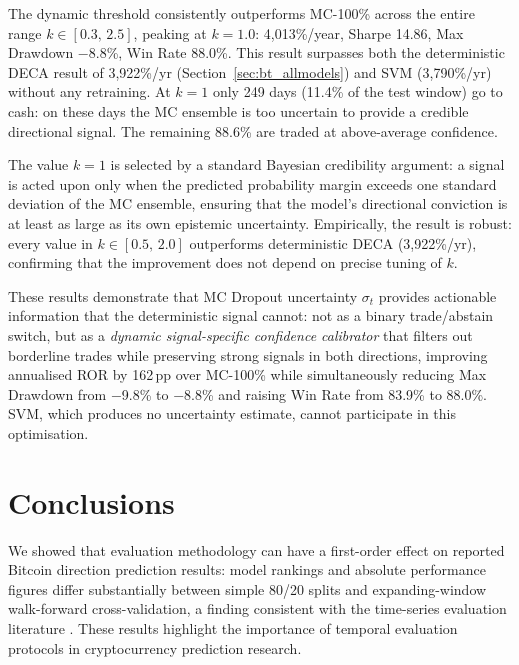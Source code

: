 \documentclass[final,3p,times,authoryear]{elsarticle}
\begin{document}
The dynamic threshold consistently outperforms MC-100\% across the
entire range $k \in [0.3,\, 2.5]$, peaking at $k=1.0$: 4{,}013\%/year,
Sharpe 14.86, Max Drawdown $-$8.8\%, Win Rate 88.0\%.
This result surpasses both the deterministic DECA result of
3{,}922\%/yr (Section~\ref{sec:bt_allmodels}) and SVM (3{,}790\%/yr)
without any retraining.
At $k=1$ only 249 days (11.4\% of the test window) go to cash: on
these days the MC ensemble is too uncertain to provide a credible
directional signal. The remaining 88.6\% are traded at above-average
confidence.

The value $k=1$ is selected by a standard Bayesian credibility argument:
a signal is acted upon only when the predicted probability margin
exceeds one standard deviation of the MC ensemble, ensuring that the
model's directional conviction is at least as large as its own
epistemic uncertainty.
Empirically, the result is robust: every value in
$k \in [0.5,\, 2.0]$ outperforms deterministic DECA (3{,}922\%/yr),
confirming that the improvement does not depend on precise tuning of
$k$.

These results demonstrate that MC Dropout uncertainty $\sigma_t$
provides actionable information that the deterministic signal cannot:
not as a binary trade/abstain switch, but as a \emph{dynamic
signal-specific confidence calibrator} that filters out borderline
trades while preserving strong signals in both directions, improving
annualised ROR by 162\,pp over MC-100\% while simultaneously reducing
Max Drawdown from $-$9.8\% to $-$8.8\% and raising Win Rate from
83.9\% to 88.0\%.
SVM, which produces no uncertainty estimate, cannot participate in
this optimisation.

\section{Conclusions}
\label{sec:conclusion}

We showed that evaluation methodology can have a first-order effect on
reported Bitcoin direction prediction results: model rankings and
absolute performance figures differ substantially between simple 80/20
splits and expanding-window walk-forward cross-validation, a finding
consistent with the time-series evaluation literature
\citep{bergmeir2012time}.
These results highlight the importance of temporal evaluation protocols
in cryptocurrency prediction research.
\end{document}
